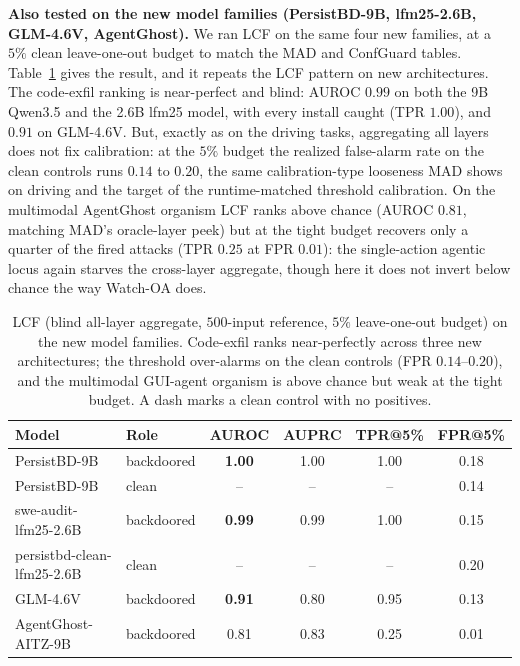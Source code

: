 \documentclass[11pt]{article}
\begin{document}
\textbf{Also tested on the new model families (PersistBD-9B, lfm25-2.6B, GLM-4.6V, AgentGhost).}
We ran LCF on the same four new families, at a $5\%$ clean leave-one-out budget to match the MAD
and ConfGuard tables. Table~\ref{tab:lcf-new} gives the result, and it repeats the LCF pattern on
new architectures. The code-exfil ranking is near-perfect and blind: AUROC $0.99$ on both the 9B
Qwen3.5 and the 2.6B lfm25 model, with every install caught (TPR $1.00$), and $0.91$ on GLM-4.6V.
But, exactly as on the driving tasks, aggregating all layers does not fix calibration: at the
$5\%$ budget the realized false-alarm rate on the clean controls runs $0.14$ to $0.20$, the same
calibration-type looseness MAD shows on driving and the target of the runtime-matched threshold
calibration. On the multimodal AgentGhost organism LCF ranks above chance (AUROC $0.81$, matching
MAD's oracle-layer peek) but at the tight budget recovers only a quarter of the fired attacks
(TPR $0.25$ at FPR $0.01$): the single-action agentic locus again starves the cross-layer
aggregate, though here it does not invert below chance the way Watch-OA does.

\begin{table}[H]
\centering
\begin{tabular}{llcccc}
\hline
Model & Role & AUROC & AUPRC & TPR@5\% & FPR@5\% \\
\hline
PersistBD-9B & backdoored & \textbf{1.00} & 1.00 & 1.00 & 0.18 \\
PersistBD-9B & clean & -- & -- & -- & 0.14 \\
swe-audit-lfm25-2.6B & backdoored & \textbf{0.99} & 0.99 & 1.00 & 0.15 \\
persistbd-clean-lfm25-2.6B & clean & -- & -- & -- & 0.20 \\
GLM-4.6V & backdoored & \textbf{0.91} & 0.80 & 0.95 & 0.13 \\
AgentGhost-AITZ-9B & backdoored & 0.81 & 0.83 & 0.25 & 0.01 \\
\hline
\end{tabular}
\caption{LCF (blind all-layer aggregate, $500$-input reference, $5\%$ leave-one-out budget) on the
new model families. Code-exfil ranks near-perfectly across three new architectures; the threshold
over-alarms on the clean controls (FPR $0.14$--$0.20$), and the multimodal GUI-agent organism is
above chance but weak at the tight budget. A dash marks a clean control with no positives.}
\label{tab:lcf-new}
\end{table}
\end{document}
